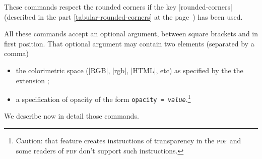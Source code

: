 \documentclass[dvipsnames]{article}%
\begin{document}
\medskip
These commands respect the rounded corners if the key |rounded-corners|
(described in the part \ref{tabular-rounded-corners} at the
page~\pageref{tabular-rounded-corners}) has been used.

\medskip
All these commands accept an optional argument, between square brackets and
in first position. That optional argument may contain two elements (separated
by a comma)
\begin{itemize}
\item the colorimetric space (|RGB|, |rgb|, |HTML|, etc) as specified by the
the extension ;
\item {}
a specification of opacity of the form \texttt{opacity =
  \textsl{value}}.\footnote{Caution: that feature creates instructions of
  transparency in the \textsc{pdf} and some readers of \textsc{pdf} don't
  support such instructions.} 
\end{itemize}

\bigskip

We describe now in detail those commands.
\end{document}

